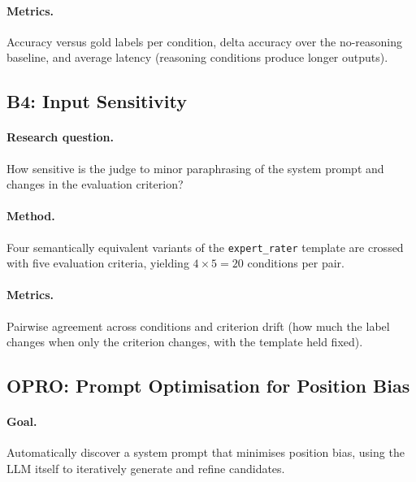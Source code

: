 \documentclass[11pt,a4paper]{article}
\begin{document}
\paragraph{Metrics.}
Accuracy versus gold labels per condition, delta accuracy over the
no-reasoning baseline, and average latency (reasoning conditions produce
longer outputs).


\subsection{B4: Input Sensitivity}\label{sec:b4}

\paragraph{Research question.}
How sensitive is the judge to minor paraphrasing of the system prompt and
changes in the evaluation criterion?

\paragraph{Method.}
Four semantically equivalent variants of the \texttt{expert\_rater} template
are crossed with five evaluation criteria, yielding $4 \times 5 = 20$
conditions per pair.

\paragraph{Metrics.}
Pairwise agreement across conditions and criterion drift (how much the
label changes when only the criterion changes, with the template held fixed).


\subsection{OPRO: Prompt Optimisation for Position Bias}\label{sec:opro}

\paragraph{Goal.}
Automatically discover a system prompt that minimises position bias, using
the LLM itself to iteratively generate and refine candidates.
\end{document}
